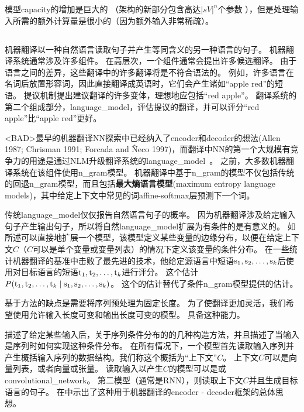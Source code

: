 模型\gls{capacity}的增加是巨大的 （架构的新部分包含高达$| sV |^n$个参数 ），但是处理输入所需的额外计算量是很小的（因为额外输入非常稀疏）。

\subsection{}
\label{sec:neural_machine_translation}

机器翻译以一种自然语言读取句子并产生等同含义的另一种语言的句子。
机器翻译系统通常涉及许多组件。
在高层次，一个组件通常会提出许多候选翻译。
由于语言之间的差异，这些翻译中的许多翻译将是不符合语法的。
例如，许多语言在名词后放置形容词，因此直接翻译成英语时，它们会产生诸如``apple red''的短语。
提议机制提出建议翻译的许多变体，理想地应包括``red apple''。
翻译系统的第二个组成部分，\gls{language_model}，评估提议的翻译，并可以评分``red apple''比``apple red''更好。


<BAD>最早的机器翻译\gls{NN}探索中已经纳入了\gls{encoder}和\gls{decoder}的想法(Allen 1987; Chrisman 1991; Forcada
and Ñeco 1997)，而翻译中\gls{NN}的第一个大规模有竞争力的用途是通过\gls{NLM}升级翻译系统的\gls{language_model}~\citep{Schwenk-et-al-IWSLT2006,Schwenk-2010}。
之前，大多数机器翻译系统在该组件使用\gls{n_gram}模型。
机器翻译中基于\gls{n_gram}的模型不仅包括传统的回退\gls{n_gram}模型，而且包括\textbf{最大熵语言模型}(maximum entropy language models)，其中给定上下文中常见的词affine-softmax层预测下一个词。

传统\gls{language_model}仅仅报告自然语言句子的概率。
因为机器翻译涉及给定输入句子产生输出句子，所以将自然\gls{language_model}扩展为有条件的是有意义的。
如所述可以直接地扩展一个模型，该模型定义某些变量的边缘分布，以便在给定上下文$C$（$C$可以是单个变量或变量列表）的情况下定义该变量的条件分布。
\citet{Devlin-et-al-ACL2014}在一些统计机器翻译的基准中击败了最先进的技术，他给定源语言中短语$\mathrm{s}_1, \mathrm{s}_2,\ldots, \mathrm{s}_k$后使用对目标语言的短语$\mathrm{t}_1, \mathrm{t}_2,\ldots, \mathrm{t}_k$进行评分。
这个估计$P(\mathrm{t}_1, \mathrm{t}_2,\ldots, \mathrm{t}_k \mid \mathrm{s}_1, \mathrm{s}_2,\ldots, \mathrm{s}_k)$。
这个的估计替代了条件\gls{n_gram}模型提供的估计。

基于方法的缺点是需要将序列预处理为固定长度。
为了使翻译更加灵活，我们希望使用允许输入长度可变和输出长度可变的模型。
具备这种能力。

描述了给定某些输入后，关于序列条件分布的的几种构造方法，并且描述了当输入是序列时如何实现这种条件分布。
在所有情况下，一个模型首先读取输入序列并产生概括输入序列的数据结构。我们称这个概括为``上下文''$C$。
上下文$C$可以是向量列表，或者向量或张量。
读取输入以产生$C$的模型可以是\citep{Cho-et-al-EMNLP2014,Sutskever-et-al-NIPS2014,Jean-et-al-arxiv2014}或\gls{convolutional_network}\citep{Kalchbrenner+Blunsom-EMNLP2013}。
第二模型（通常是RNN），则读取上下文$C$并且生成目标语言的句子。
在中示出了这种用于机器翻译的\gls{encoder} - \gls{decoder}框架的总体思想。

